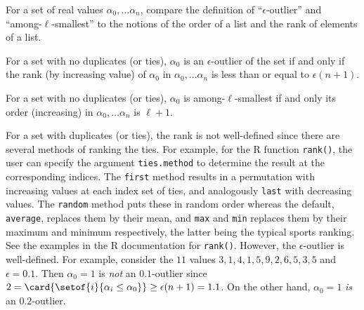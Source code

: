 \documentclass[12pt]{article}
\begin{document}
\begin{exercise}
    For a set of real values \( \alpha_0, \dots \alpha_n \), compare the
    definition of ``\( \epsilon \)-outlier'' and ``among-\( \ell \)-smallest''
    to the notions of the order of a list and the rank of elements of a
    list.
\end{exercise}
\begin{solution}
    For a set with no duplicates (or ties), \( \alpha_0 \) is an \(
    \epsilon \)-outlier of the set if and only if the rank (by
    increasing value) of \( \alpha_0 \) in \( \alpha_0, \dots \alpha_n \)
    is less than or equal to \( \epsilon(n+1) \).

    For a set with no duplicates (or ties), \( \alpha_0 \) is among-\(
    \ell \)-smallest if and only its order (increasing) in \( \alpha_0,
    \dots \alpha_n \) is \( \ell + 1 \).

    For a set with duplicates (or ties), the rank is not well-defined
    since there are several methods of ranking the ties.  For example,
    for the R function \texttt{rank()}, the user can specify the
    argument \texttt{ties.method} to determine the result at the
    corresponding indices.  The \texttt{first} method results in a
    permutation with increasing values at each index set of ties, and
    analogously \texttt{last} with decreasing values.  The \texttt{random}
    method puts these in random order whereas the default, \texttt{average},
    replaces them by their mean, and \texttt{max} and \texttt{min}
    replaces them by their maximum and minimum respectively, the latter
    being the typical sports ranking.  See the examples in the R
    documentation for \texttt{rank()}.  However, the \( \epsilon \)-outlier
    is well-defined.  For example, consider the \( 11 \) values \( 3, 1,
    4, 1, 5, 9, 2, 6, 5, 3, 5 \) and \( \epsilon = 0.1 \).  Then \(
    \alpha_0 = 1 \) is \emph{not} an \( 0.1 \)-outlier since \( 2 =
    \card{%
    \setof{i}{\alpha_i \le \alpha_0}} \ge \epsilon(n+1) = 1.1 \).  On
    the other hand, \( \alpha_0 = 1 \) \emph{is} an \( 0.2 \)-outlier.
\end{solution}
\end{document}
